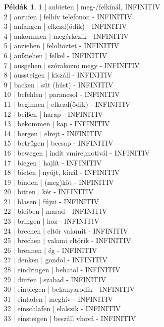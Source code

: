 \documentclass{article}
\theoremstyle{definition}
\newtheorem*{exmp}{Példák}
\begin{document}
\begin{exmp}
1 | anbieten | meg-/felkínál, INFINITIV\\
2 | anrufen | felhív telefonon - INFINITIV\\
3 | anfangen | elkezd(ődik) - INFINITIV\\
4 | ankommen | megérkezik - INFINITIV\\
5 | anziehen | felöltöztet - INFINITIV\\
6 | aufstehen | felkel - INFINITIV\\
7 | ausgehen | szórakozni megy - INFINITIV\\
8 | aussteigen | kiszáll - INFINITIV\\
9 | backen | süt (húst) - INFINITIV\\
10 | befehlen | parancsol - INFINITIV\\
11 | beginnen | elkezd(ődik) - INFINITIV\\
12 | beißen | harap - INFINITIV\\
13 | bekommen | kap - INFINITIV\\
14 | bergen | elrejt - INFINITIV\\
15 | betrügen | becsap - INFINITIV\\
16 | bewegen | indít vmire,motivál - INFINITIV\\
17 | biegen | hajlít - INFINITIV\\
18 | bieten | nyújt, kínál - INFINITIV\\
19 | binden | (meg)köt - INFINITIV\\
20 | bitten | kér - INFINITIV\\
21 | blasen | fújni - INFINITIV\\
22 | bleiben | marad - INFINITIV\\
23 | bringen | hoz - INFINITIV\\
24 | brechen | eltör valamit - INFINITIV\\
25 | brechen | valami eltörik - INFINITIV\\
26 | brennen | ég - INFINITIV\\
27 | denken | gondol - INFINITIV\\
28 | eindringen | behatol - INFINITIV\\
29 | dürfen | szabad - INFINITIV\\
30 | einbiegen | bekanyarodik - INFINITIV\\
31 | einladen | meghív - INFINITIV\\
32 | einschlafen | elalszik - INFINITIV\\
33 | einsteigen | beszáll vhová - INFINITIV\\

\end{exmp}
\end{document}
